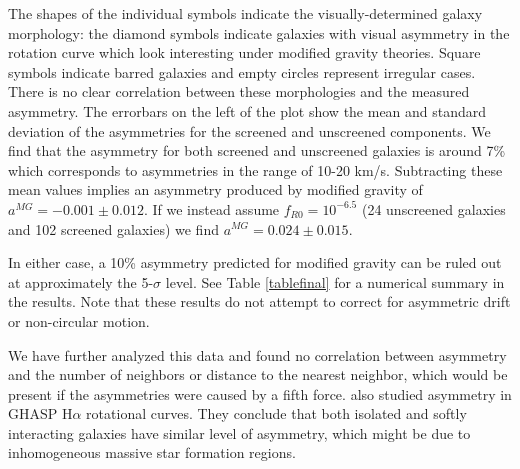 \documentclass[useAMS,usenatbib,twocolumn]{mn2e}
\begin{document}
The shapes of the individual symbols indicate the visually-determined galaxy
morphology: the diamond symbols indicate
galaxies with visual asymmetry in the rotation curve which look interesting
under modified gravity theories. Square symbols indicate barred
galaxies and empty circles represent irregular cases.
There is no clear correlation between these morphologies and the
measured asymmetry.   The errorbars on the left of the plot show the
mean and standard deviation of the asymmetries for the screened and unscreened
components. We find that the asymmetry for both
screened and unscreened galaxies is around 7\% which corresponds to
asymmetries in the range of 10-20 km/s.
Subtracting these mean values implies an asymmetry produced by modified
gravity of $a^{MG}=-0.001\pm 0.012$.
If we instead assume $f_{R0}=10^{-6.5}$ (24 unscreened galaxies and 102
screened galaxies) we find $a^{MG}=0.024\pm 0.015$.

In either case, a 10\% asymmetry predicted for modified gravity can be
ruled out at approximately the 5-$\sigma$ level.
See Table \ref{tablefinal} for a numerical summary in the results.  Note that
these results do not attempt to correct for asymmetric drift or non-circular
motion.

We have further analyzed this data and found no correlation between
asymmetry and the number of neighbors or distance to the nearest neighbor,
which would be present if the asymmetries were caused by a fifth force.
\citet{garrido05} also studied asymmetry in
GHASP H$\alpha$ rotational curves. They conclude that both isolated and softly
interacting galaxies have similar level of asymmetry, which might be due to
inhomogeneous massive star formation regions.
\end{document}
